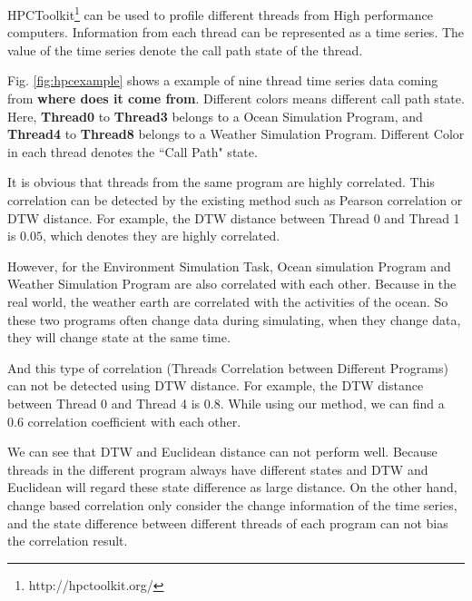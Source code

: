 
HPCToolkit\footnote{http://hpctoolkit.org/} can be used to profile different threads from High performance computers.
Information from each thread can be represented as a time series. The value of the time series denote the call path \cite{adhianto2010hpctoolkit} state of the thread.


Fig. \ref{fig:hpcexample} shows a example of nine thread time series data coming from {\bf where does it come from}. Different colors means different call path state. Here, \textbf{Thread0} to \textbf{Thread3} belongs to a Ocean Simulation Program, and \textbf{Thread4} to \textbf{Thread8} belongs to a Weather Simulation Program. Different Color in each thread denotes the ``Call Path" state.

It is obvious that threads from the same program are highly correlated. This correlation can be detected by the existing method such as Pearson correlation or DTW distance. For example, the DTW distance between Thread 0 and Thread 1 is $0.05$, which denotes they are highly correlated.

However, for the Environment Simulation Task, Ocean simulation Program and Weather Simulation Program are also correlated with each other. Because in the real world, the weather earth are correlated with the activities of the ocean.  So these two programs often change data during simulating, when they change data, they will change state at the same time.

And this type of correlation (Threads Correlation between Different Programs) can not be detected using DTW distance. For example, the DTW distance between Thread 0 and Thread 4 is $0.8$. While using our method, we can find a $0.6$ correlation coefficient with each other.

We can see that DTW and Euclidean distance can not perform well. Because threads in the different program always have different states and DTW and Euclidean will regard these state difference as large distance.
On the other hand, change based correlation only consider the change information of the time series, and the state difference between different threads of each program can not bias the correlation result.



